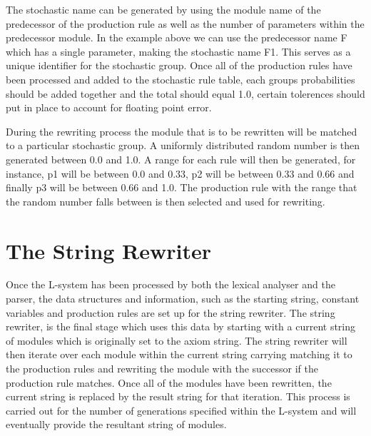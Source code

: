 \begin{flushleft}
\vspace{5mm}

The stochastic name can be generated by using the module name of the predecessor of the production rule as well as the number of parameters within the predecessor module. In the example above we can use the predecessor name F which has a single parameter, making the stochastic name F1. This serves as a unique identifier for the stochastic group. Once all of the production rules have been processed and added to the stochastic rule table, each groups probabilities should be added together and the total should equal 1.0, certain tolerences should put in place to account for floating point error. \\

\vspace{5mm}

During the rewriting process the module that is to be rewritten will be matched to a particular stochastic group. A uniformly distributed random number is then generated between 0.0 and 1.0. A range for each rule will then be generated, for instance, p1 will be between 0.0 and 0.33, p2 will be between 0.33 and 0.66 and finally p3 will be between 0.66 and 1.0. The production rule with the range that the random number falls between is then selected and used for rewriting. \\

\end{flushleft}

\section{The String Rewriter}

\begin{flushleft}

Once the L-system has been processed by both the lexical analyser and the parser, the data structures and information, such as the starting string, constant variables and production rules are set up for the string rewriter. The string rewriter, is the final stage which uses this data by starting with a current string of modules which is originally set to the axiom string. The string rewriter will then iterate over each module within the current string carrying matching it to the production rules and rewriting the module with the successor if the production rule matches. Once all of the modules have been rewritten, the current string is replaced by the result string for that iteration. This process is carried out for the number of generations specified within the L-system and will eventually provide the resultant string of modules.

\end{flushleft}


